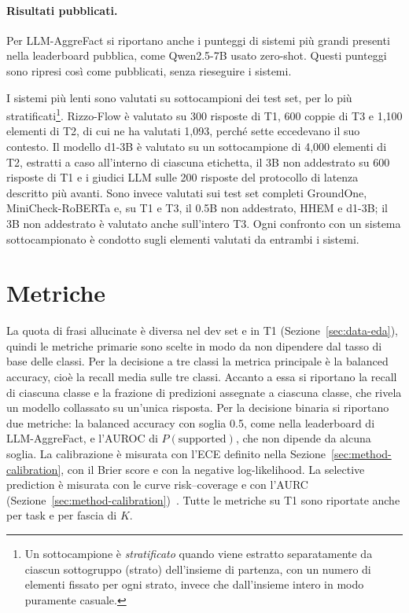 \paragraph{Risultati pubblicati.} Per LLM-AggreFact si riportano anche i punteggi di sistemi più grandi presenti nella
leaderboard pubblica, come Qwen2.5-7B usato zero-shot. Questi punteggi sono ripresi così come pubblicati, senza
rieseguire i sistemi.

I sistemi più lenti sono valutati su sottocampioni dei test set, per lo più stratificati\footnote{Un sottocampione è
\emph{stratificato} quando viene estratto separatamente da ciascun sottogruppo (strato) dell'insieme di partenza, con un
numero di elementi fissato per ogni strato, invece che dall'insieme intero in modo puramente casuale.}. Rizzo-Flow è
valutato su 300 risposte di T1, 600 coppie di T3 e 1{,}100 elementi di T2, di cui ne ha valutati 1{,}093, perché sette
eccedevano il suo contesto. Il modello d1-3B è valutato su un sottocampione di 4{,}000 elementi di T2, estratti a caso all'interno di ciascuna etichetta, il 3B non
addestrato su 600 risposte di T1 e i giudici LLM sulle 200 risposte del protocollo di latenza descritto più
avanti. Sono invece valutati sui test set completi GroundOne, MiniCheck-RoBERTa e, su T1 e T3, il 0.5B non addestrato, HHEM e d1-3B; il 3B non addestrato è valutato anche sull'intero T3.
Ogni confronto con un sistema sottocampionato è condotto sugli elementi valutati da entrambi i sistemi.

\section{Metriche}
\label{sec:setup-metrics}

La quota di frasi allucinate è diversa nel dev set e in T1 (Sezione~\ref{sec:data-eda}), quindi le metriche primarie
sono scelte in modo da non dipendere dal tasso di base delle classi. Per la decisione a tre classi la metrica principale
è la balanced accuracy, cioè la recall media sulle tre classi. Accanto a essa si riportano la recall di ciascuna classe
e la frazione di predizioni assegnate a ciascuna classe, che rivela un modello collassato su un'unica risposta. Per la
decisione binaria si riportano due metriche: la balanced accuracy con soglia 0.5, come nella leaderboard di
LLM-AggreFact, e l'AUROC di $P(\text{supported})$, che non dipende da alcuna soglia. La calibrazione è misurata con l'ECE
definito nella Sezione~\ref{sec:method-calibration}, con il Brier score e con la negative log-likelihood. La selective
prediction è misurata con le curve risk--coverage e con l'AURC (Sezione~\ref{sec:method-calibration})~\cite{geifman2017selective}. Tutte
le metriche su T1 sono riportate anche per task e per fascia di $K$.

